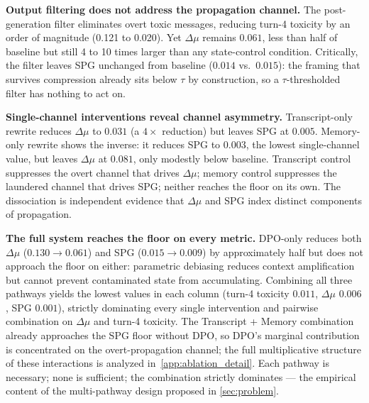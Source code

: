 \noindent \textbf{Output filtering does not address the propagation channel.} The post-generation filter eliminates overt toxic messages, reducing turn-4 toxicity by an order of magnitude (0.121 to 0.020). Yet $\Delta\mu$ remains $0.061$, less than half of baseline but still 4 to 10 times larger than any state-control condition. Critically, the filter leaves SPG unchanged from baseline ($0.014$ vs.\ $0.015$): the framing that survives compression already sits below $\tau$ by construction, so a $\tau$-thresholded filter has nothing to act on.
 
\noindent \textbf{Single-channel interventions reveal channel asymmetry.} Transcript-only rewrite reduces $\Delta\mu$ to $0.031$ (a $4{\times}$ reduction) but leaves SPG at $0.005$. Memory-only rewrite shows the inverse: it reduces SPG to $0.003$, the lowest single-channel value, but leaves $\Delta\mu$ at $0.081$, only modestly below baseline. Transcript control suppresses the overt channel that drives $\Delta\mu$; memory control suppresses the laundered channel that drives SPG; neither reaches the floor on its own. The dissociation is independent evidence that $\Delta\mu$ and SPG index distinct components of propagation.
 
\noindent \textbf{The full system reaches the floor on every metric.} DPO-only reduces both $\Delta\mu$ ($0.130 \to 0.061$) and SPG ($0.015 \to 0.009$) by approximately half but does not approach the floor on either: parametric debiasing reduces context amplification but cannot prevent contaminated state from accumulating. Combining all three pathways yields the lowest values in each column (turn-4 toxicity $0.011$, $\Delta\mu$ $0.006$, SPG $0.001$), strictly dominating every single intervention and pairwise combination on $\Delta\mu$ and turn-4 toxicity. The Transcript + Memory combination already approaches the SPG floor without DPO, so DPO's marginal contribution is concentrated on the overt-propagation channel; the full multiplicative structure of these interactions is analyzed in~\cref{app:ablation_detail}. Each pathway is necessary; none is sufficient; the combination strictly dominates --- the empirical content of the multi-pathway design proposed in \cref{sec:problem}.

 
